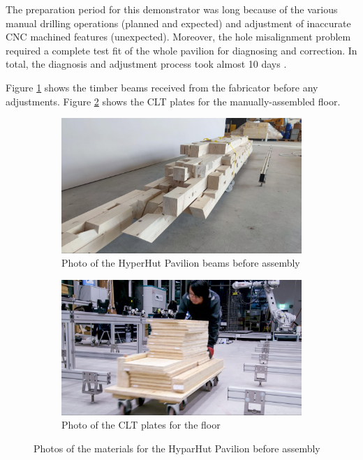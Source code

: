 The preparation period for this demonstrator was long because of the various manual drilling operations (planned and expected) and adjustment of inaccurate CNC machined features (unexpected). Moreover, the hole misalignment problem required a complete test fit of the whole pavilion for diagnosing and correction. In total, the diagnosis and adjustment process took almost 10 days . 

Figure \ref{fig:photo-hyperhut-beams} shows the timber beams received from the fabricator before any adjustments. Figure \ref{fig:photo-clt-plates} shows the CLT plates for the manually-assembled floor.


\begin{figure}[!h]
    \centering
    \begin{subfigure}[b]{0.49\textwidth}
        \centering
        \includegraphics[width=\textwidth]{images/7b/img12.jpg}
        \caption{Photo of the HyperHut Pavilion beams before assembly}
        \label{fig:photo-hyperhut-beams}
    \end{subfigure}
    \hfill
    \begin{subfigure}[b]{0.49\textwidth}
        \centering
        \includegraphics[width=\textwidth]{images/7b/img13.jpg}
        \caption{Photo of the CLT plates for the floor}
        \label{fig:photo-clt-plates}
    \end{subfigure}
    \caption{Photos of the materials for the HyparHut Pavilion before assembly}
    \label{fig:photo-hyperhut-materials}
\end{figure}

